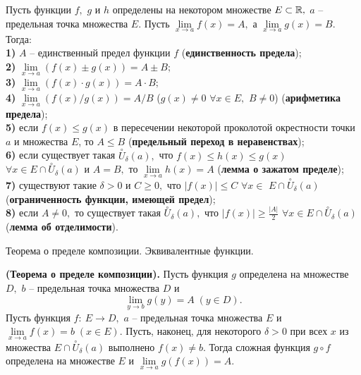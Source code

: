 \begin{theorem} Пусть функции $f,$ $g$ и $h$
	определены на некотором множестве $E\subset\mathbb{R},$
	$a$ -- предельная точка множества $E.$
	Пусть $\lim\limits_{x\rightarrow a}f(x)=A,$ а
	$\lim\limits_{x\rightarrow a}g(x)=B$. Тогда:\\
	\textbf{1)} $A$ -- единственный предел функции $f$
	(\textbf{единственность предела});\\
	\textbf{2)} $\lim\limits_{x\rightarrow a}(f(x)\pm g(x))=A\pm B;$\\
	\textbf{3)} $\lim\limits_{x\rightarrow a}(f(x)\cdot g(x))=A\cdot B;$\\
	\textbf{4)} $\lim\limits_{x\rightarrow a}(f(x)/g(x))=A/B$
	($g(x)\neq0$ $\forall x \in E,$ $B\neq0$)
	(\textbf{арифметика предела});\\
	\textbf{5)} если $f(x)\leq g(x)$ в пересечении некоторой
	проколотой окрестности точки $a$ и множества $E$, то $A\leq B$
	(\textbf{предельный переход в неравенствах});\\
	\textbf{6)} если существует такая
	$\stackrel{\circ}{U}_{\delta}(a),$ что
	$f(x)\leq h(x)\leq g(x)$ $\forall
		x\in E\cap\stackrel{\circ}{U}_{\delta}(a)$
	и $A=B,$ то
	$\lim\limits_{x\rightarrow a}h(x)=A$
	(\textbf{лемма о зажатом пределе});\\
	\textbf{7)} существуют такие $\delta>0$
	и $C\geq0,$ что
	$|f(x)|\leq C$ $\forall x\in$
	$E\cap\stackrel{\circ}{U}_{\delta}(a)$
	(\textbf{ограниченность функции, имеющей предел});\\
	\textbf{8)} если $A\neq0,$ то существует такая
	$\stackrel{\circ}{U}_{\delta}(a),$ что
	$|f(x)|\geq\frac{|A|}{2}$ $\forall x\in
		E\cap\stackrel{\circ}{U}_{\delta}(a)$
	(\textbf{лемма об отделимости}).
\end{theorem}

\newpage
\begin{problem}
Теорема о пределе композиции. Эквивалентные функции.
\end{problem}

\begin{theorem} \textbf{(Теорема о пределе композиции).}
	Пусть функция $g$ определена на множестве $D,$
	$b$ -- предельная точка множества $D$ и
	$$
		\lim\limits_{y\rightarrow b}g(y)=A\;(y\in D).
	$$
	Пусть функция $f: \ E\rightarrow D,$
	$a$ -- предельная точка множества $E$ и
	$\lim\limits_{x\rightarrow a}f(x)=b\;(x\in E).$
	Пусть, наконец, для некоторого $\delta>0$
	при всех $x$ из множества
	$E\cap\stackrel{\circ}{U}_{\delta}(a)$
	выполнено $f(x)\neq b.$
	Тогда сложная функция $g\circ f$ определена
	на множестве $E$ и
	$\lim\limits_{x\rightarrow a}g(f(x))=A.$
\end{theorem}

